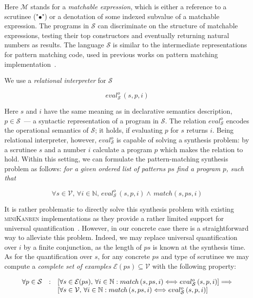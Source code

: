 \documentclass[submission,copyright,creativecommons]{eptcs}
\def\transarrow{\xrightarrow}
\newcommand{\setarrow}[1]{\def\transarrow{#1}}
\def\padding{\phantom{X}}
\def\subarrow{}
\newcommand{\setsubarrow}[1]{\def\subarrow{#1}}
\newcommand{\withenv}[2]{{#1}\vdash{#2}}
\newcommand{\trans}[3]{{#1}\transarrow{\padding{\textstyle #2}\padding}\subarrow{#3}}
\newcommand{\inbr}[1]{\left<{#1}\right>}
\newcommand{\ir}{\ensuremath{\mathcal{S}}}
\begin{document}
Here $\mathcal{M}$ stands for a \emph{matchable expression}, which is either a reference to a scrutinee ("$\bullet$") or
a denotation of some indexed subvalue of a matchable expression. The programs in $\ir$ can discriminate on the
structure of matchable expressions, testing their top constructors and eventually returning natural numbers as results.
The language $\ir$ is similar to the intermediate representations for pattern matching code, used in 
previous works on pattern matching implementation~\cite{maranget2001,maranget2008}.

We use a \emph{relational interpreter} for $\ir$

\[
eval^o_{\ir}\, (s, p, i)
\]

Here $s$ and $i$ have the same meaning as in declarative semantics description, $p\in\ir$~--- a syntactic representation of
a program in $\ir$. The relation $eval^o_{\ir}$ encodes the operational semantics of $\ir$; it holds, if
evaluating $p$ for $s$ returns $i$. Being relational interpreter, however, $eval^o_{\ir}$ is capable of solving a
synthesis problem: by a scrutinee $s$ and a number $i$ calculate a program $p$ which makes the relation to hold.
Within this setting, we can formulate the pattern-matching synthesis problem as follows: \emph{for a given ordered list of patterns $ps$ find a program $p$, such that}

\[
\forall s\in\mathcal{V},\,\forall i\in\mathbb{N},\,eval^o_{\ir}\, (s, p, i) \wedge\, match (s, ps, i)
\]

It is rather problematic to directly solve this synthesis problem with existing \textsc{miniKanren} implementations as
they provide a rather limited support for universal quantification~\cite{eigen,moiseenko}. However, in our concrete
case there is a straightforward way to alleviate this problem. Indeed, we may replace universal quantification over $i$ by
a finite conjunction, as the length of $ps$ is known at the synthesis time. As for the quantification over $s$, for
any concrete $ps$ and type of scrutinee we may compute a \emph{complete set of examples} $\mathcal{E}(ps)\subseteq\mathcal{V}$ with the following
property:


\[
\setarrow{\xrightarrow}
\begin{array}{rcl}
  \forall p\in\mathcal S & : & [\forall s\in\mathcal{E}(ps),\,\forall i\in\mathbb{N} : 
  match\, (s, ps, i)
  \Longleftrightarrow
  eval^o_{\ir}\, (s, p, i) 
  ] \Longrightarrow \\
                          &   & [\forall s\in\mathcal V,\,\forall i\in\mathbb{N} : %
                          match\, (s, ps, i)
                           \Longleftrightarrow  %
                          eval^o_{\ir}\, (s, p, i) 
                          ]
\end{array}
\]
\end{document}
